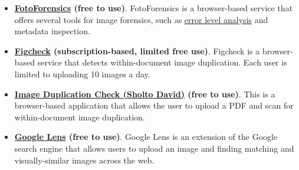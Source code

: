 \documentclass[letterpaper, 12pt]{article}
\begin{document}
\begin{itemize}
    \item \textbf{\href{https://fotoforensics.com/}{FotoForensics} (free to use)}. FotoForensics is a browser-based service that offers several tools for image forensics, such as \href{https://en.wikipedia.org/wiki/Error_level_analysis}{error level analysis} and metadata inspection.
    \item \textbf{\href{https://www.figcheck.com/imagecheck}{Figcheck} (subscription-based, limited free use)}. Figcheck is a browser-based service that detects within-document image duplication. Each user is limited to uploading 10 images a day.
    \item \textbf{\href{https://sholtodavid.pythonanywhere.com/}{Image Duplication Check (Sholto David)} (free to use)}. This is a browser-based application that allows the user to upload a PDF and scan for within-document image duplication. 
    \item \textbf{\href{https://www.google.com/?olud=}{Google Lens} (free to use)}. Google Lens is an extension of the Google search engine that allows users to upload an image and finding matching and visually-similar images across the web.
\end{itemize}
\end{document}

